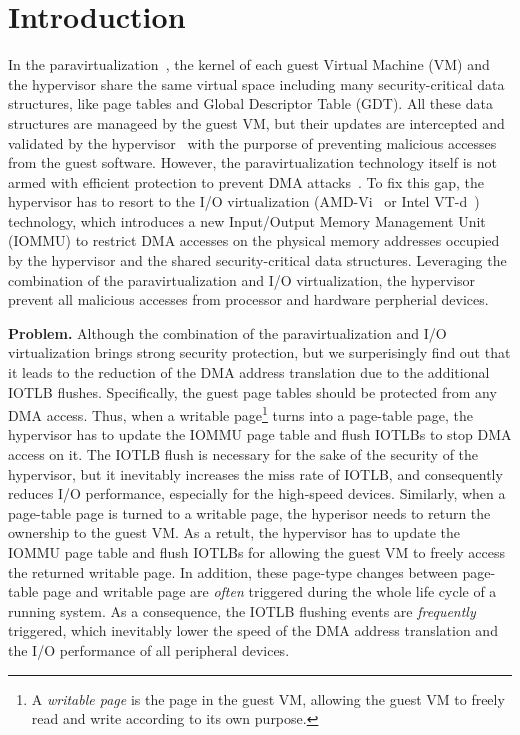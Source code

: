 \section{Introduction} \label{sec:intro}
In the paravirtualization~\cite{XEN-SOSP03,denali-paravirtualization}, the kernel of each guest Virtual Machine (VM) and the hypervisor share the same virtual space including many security-critical data structures, like page tables and Global Descriptor Table (GDT). All these data structures are manageed by the guest VM, but their updates are intercepted and validated by the hypervisor~\cite{XEN-SOSP03} with the purporse of preventing malicious accesses from the guest software.
However, the paravirtualization technology itself is not armed with efficient protection to prevent DMA attacks~\cite{disaggregation}.
To fix this gap, the hypervisor has to resort to the I/O virtualization (AMD-Vi~\cite{amdvt} or Intel VT-d~\cite{intelvt}) technology, which introduces a new Input/Output Memory Management Unit (IOMMU) to restrict DMA accesses on the physical memory addresses occupied by the hypervisor and the shared security-critical data structures. 
Leveraging the combination of the paravirtualization and I/O virtualization, the hypervisor prevent all malicious accesses from processor and hardware perpherial devices.

\textbf{Problem.} Although the combination of the paravirtualization and I/O virtualization brings strong security protection, but we surperisingly find out that it leads to the reduction of the DMA address translation due to the additional IOTLB flushes. 
Specifically, the guest page tables should be protected from any DMA access.
Thus, when a writable page\footnote{A \emph{writable page} is the page in the guest VM, allowing the guest VM to freely read and write according to its own purpose.} turns into a page-table page, the hypervisor has to update the IOMMU page table and flush IOTLBs to stop DMA access on it.
The IOTLB flush is necessary for the sake of the security of the hypervisor, but it inevitably increases the miss rate of IOTLB, and consequently reduces I/O performance, especially for the high-speed devices. 
Similarly, when a page-table page is turned to a writable page, the hyperisor needs to return the ownership to the guest VM.
As a retult, the hypervisor has to update the IOMMU page table and flush IOTLBs for allowing the guest VM to freely access the returned writable page. 
In addition, these page-type changes between page-table page and writable page are \emph{often} triggered during the whole life cycle of a running system.
As a consequence, the IOTLB flushing events are \emph{frequently} triggered, which inevitably lower the speed of the DMA address translation and the I/O performance of all peripheral devices.

